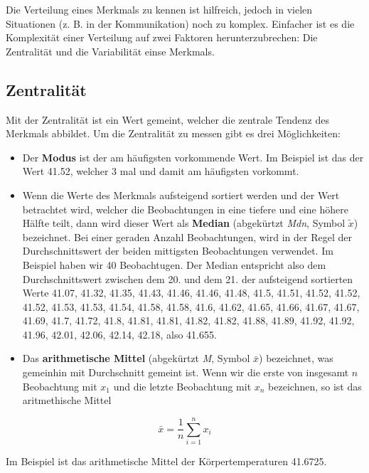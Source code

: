 \documentclass[
]{book}
\providecommand{\tightlist}{%
  \setlength{\itemsep}{0pt}\setlength{\parskip}{0pt}}
\theoremstyle{definition}
\theoremstyle{definition}
\theoremstyle{definition}
\theoremstyle{definition}
\theoremstyle{remark}
\begin{document}
Die Verteilung eines Merkmals zu kennen ist hilfreich, jedoch in vielen Situationen (z. B. in der Kommunikation) noch zu komplex. Einfacher ist es die Komplexität einer Verteilung auf zwei Faktoren herunterzubrechen: Die Zentralität und die Variabilität einse Merkmals.

\subsection{Zentralität}\label{zentralitaet}

Mit der Zentralität ist ein Wert gemeint, welcher die zentrale Tendenz des Merkmals abbildet. Um die Zentralität zu messen gibt es drei Möglichkeiten:

\begin{itemize}
\tightlist
\item
  Der \textbf{Modus} ist der am häufigsten vorkommende Wert. Im Beispiel ist das der Wert 41.52, welcher 3 mal und damit am häufigsten vorkommt.
\item
  Wenn die Werte des Merkmals aufsteigend sortiert werden und der Wert betrachtet wird, welcher die Beobachtungen in eine tiefere und eine höhere Hälfte teilt, dann wird dieser Wert als \textbf{Median} (abgekürtzt \emph{Mdn}, Symbol \(\tilde{x}\)) bezeichnet. Bei einer geraden Anzahl Beobachtungen, wird in der Regel der Durchschnittswert der beiden mittigsten Beobachtungen verwendet. Im Beispiel haben wir 40 Beobachtugen. Der Median entspricht also dem Durchschnittswert zwischen dem 20. und dem 21. der aufsteigend sortierten Werte 41.07, 41.32, 41.35, 41.43, 41.46, 41.46, 41.48, 41.5, 41.51, 41.52, 41.52, 41.52, 41.53, 41.53, 41.54, 41.58, 41.58, 41.6, 41.62, 41.65, 41.66, 41.67, 41.67, 41.69, 41.7, 41.72, 41.8, 41.81, 41.81, 41.82, 41.82, 41.88, 41.89, 41.92, 41.92, 41.96, 42.01, 42.06, 42.14, 42.18, also 41.655.
\item
  Das \textbf{arithmetische Mittel} (abgekürtzt \emph{M}, Symbol \(\bar{x}\)) bezeichnet, was gemeinhin mit Durchschnitt gemeint ist. Wenn wir die erste von insgesamt \(n\) Beobachtung mit \(x_1\) und die letzte Beobachtung mit \(x_n\) bezeichnen, so ist das aritmethische Mittel
\end{itemize}

\begin{equation}
\bar{x} = \frac{1}{n}\sum^n_{i=1} x_i
\label{eq:mean}
\end{equation}

Im Beispiel ist das arithmetische Mittel der Körpertemperaturen 41.6725.
\end{document}
